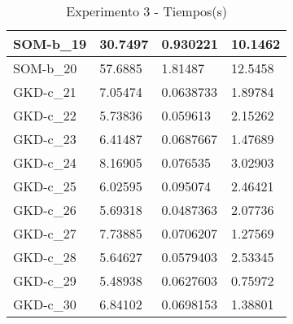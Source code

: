 \documentclass[11pt,a4paper]{article}
\begin{document}
\begin{table}[H]
\begin{tabular}{l|l|l|l|}
			\multicolumn{1}{|l|}{SOM-b\_19} & 30.7497        & 0.930221        & 10.1462       \\ \hline
			\multicolumn{1}{|l|}{SOM-b\_20} & 57.6885        & 1.81487         & 12.5458       \\ \hline
			\multicolumn{1}{|l|}{GKD-c\_21} & 7.05474        & 0.0638733       & 1.89784       \\ \hline
			\multicolumn{1}{|l|}{GKD-c\_22} & 5.73836        & 0.059613        & 2.15262       \\ \hline
			\multicolumn{1}{|l|}{GKD-c\_23} & 6.41487        & 0.0687667       & 1.47689       \\ \hline
			\multicolumn{1}{|l|}{GKD-c\_24} & 8.16905        & 0.076535        & 3.02903       \\ \hline
			\multicolumn{1}{|l|}{GKD-c\_25} & 6.02595        & 0.095074        & 2.46421       \\ \hline
			\multicolumn{1}{|l|}{GKD-c\_26} & 5.69318        & 0.0487363       & 2.07736       \\ \hline
			\multicolumn{1}{|l|}{GKD-c\_27} & 7.73885        & 0.0706207       & 1.27569       \\ \hline
			\multicolumn{1}{|l|}{GKD-c\_28} & 5.64627        & 0.0579403       & 2.53345       \\ \hline
			\multicolumn{1}{|l|}{GKD-c\_29} & 5.48938        & 0.0627603       & 0.75972       \\ \hline
			\multicolumn{1}{|l|}{GKD-c\_30} & 6.84102        & 0.0698153       & 1.38801       \\ \hline
		\end{tabular}
		\caption{ Experimento 3 - Tiempos(s) }
		\label{tiempos3}
	\end{table}
	
\end{document}
